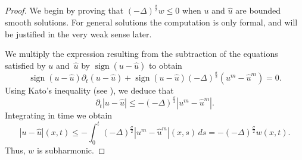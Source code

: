 \documentclass[leqno,12pt]{amsart}
\theoremstyle{definition}
\theoremstyle{remark}
\numberwithin{equation}{section}
\begin{document}
\begin{proof}
We begin by proving that $(-\Delta)^{\frac\sigma2}w\le0$ when $u$ and $\hat{u}$ are bounded smooth solutions. For general solutions the computation is only formal, and will be justified in the very weak sense later.

We multiply the expression resulting from the subtraction of the equations satisfied by $u$ and~$\hat u$ by $\operatorname{sign}(u-\hat{u})$ to obtain
$$
 \operatorname{sign}(u-\hat{u})\partial_t (u-\hat{u})+\operatorname{sign}(u-\hat{u})(-\Delta)^{\frac\sigma2}(u^{m}-\hat{u}^{m})=0.
$$
Using Kato's inequality (see \cite{cordobaforuniqueness}), we deduce that
\begin{equation}\label{eq:Kato}
    \partial_t |u-\hat{u}|\leq-(-\Delta)^{\frac\sigma2}|u^{m}-\hat{u}^{m}|.
\end{equation}
Integrating in time we obtain    
$$
        |u-\hat{u}|(x,t)\leq -\int_{0}^{t}(-\Delta)^{\frac\sigma2}|u^{m}-\hat{u}^{m}|(x,s)\,ds=-(-\Delta)^{\frac\sigma2}w(x,t).
$$
Thus, $w$ is subharmonic. 


\end{proof}
\end{document}
